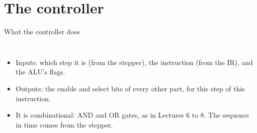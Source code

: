 \documentclass[10pt]{wosm-slides}
\begin{document}
\section{The controller}

\begin{frame}{What the controller does}
  \begin{columns}[c, totalwidth=\textwidth]
      \centering
      \begin{itemize}
        \item Inputs: which step it is (from the stepper), the instruction (from the
          IR), and the ALU's flags.
        \item Outputs: the enable and select bits of every other part, for this step
          of this instruction.
        \item It is \alert{combinational}: AND and OR gates, as in Lectures 6 to 8.
          The sequence in time comes from the stepper.
      \end{itemize}
  \end{columns}
\end{frame}
\end{document}
